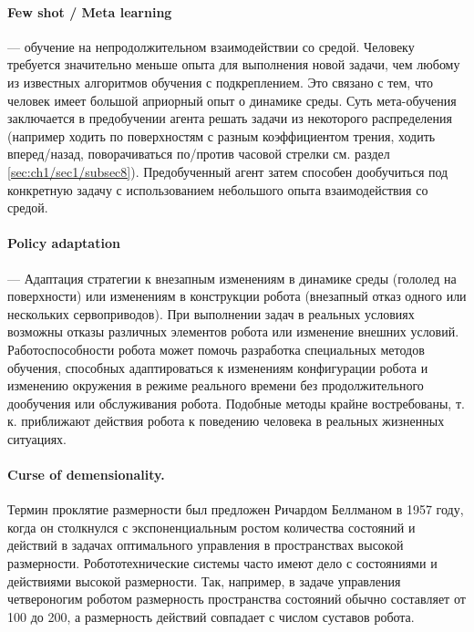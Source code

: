 \paragraph{Few shot / Meta learning} --- обучение на непродолжительном взаимодействии со средой. Человеку требуется значительно меньше опыта для выполнения новой задачи, чем любому из известных алгоритмов обучения с подкреплением. Это связано с тем, что человек имеет большой априорный опыт о динамике среды. Суть мета-обучения заключается в предобучении агента решать задачи из некоторого распределения (например ходить по поверхностям с разным коэффициентом трения, ходить вперед/назад, поворачиваться по/против часовой стрелки см. раздел \ref{sec:ch1/sec1/subsec8}). Предобученный агент затем способен дообучиться под конкретную задачу с использованием небольшого опыта взаимодействия со средой. 

\paragraph{Policy adaptation} --- Адаптация стратегии к внезапным изменениям в динамике среды (гололед на поверхности) или изменениям в конструкции робота (внезапный отказ одного или нескольких сервоприводов). При выполнении задач в реальных условиях возможны отказы различных элементов робота или изменение внешних условий. Работоспособности робота может помочь разработка специальных методов обучения, способных адаптироваться к изменениям конфигурации робота и изменению окружения в режиме реального времени без продолжительного дообучения или обслуживания робота. Подобные методы крайне востребованы, т. к. приближают действия робота к поведению человека в реальных жизненных ситуациях.

\paragraph{Curse of demensionality.}
Термин проклятие размерности был предложен Ричардом Беллманом в 1957 году, когда он столкнулся с экспоненциальным ростом количества состояний и действий в задачах оптимального управления в пространствах высокой размерности. Робототехнические системы часто имеют дело с состояниями и действиями высокой размерности. Так, например, в задаче управления четвероногим роботом размерность пространства состояний обычно составляет от 100 до 200, а размерность действий совпадает с числом суставов робота. 

